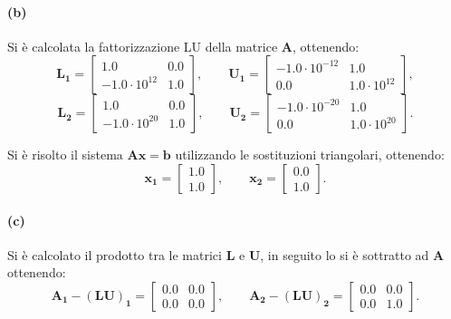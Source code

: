 \documentclass[letterpaper, 12pt]{article}
\begin{document}
\paragraph{(b) } \label{par:fattorizzazione_LU} Si è calcolata la fattorizzazione LU della matrice $\mathbf{A}$, ottenendo:
\begin{equation}
    \mathbf{L_1} = \begin{bmatrix}
    1.0      &  0.0 \\
    -1.0 \cdot 10^{12}  &  1.0 
    \end{bmatrix}, \qquad
    \mathbf{U_1} = \begin{bmatrix}
    -1.0 \cdot 10^{-12}  &  1.0               \\
     0.0                 &  1.0 \cdot 10^{12}
    \end{bmatrix},
\end{equation}
\begin{equation}
    \mathbf{L_2} = \begin{bmatrix}
    1.0                 &  0.0 \\
    -1.0 \cdot 10^{20}  &  1.0
    \end{bmatrix}, \qquad
    \mathbf{U_2} = \begin{bmatrix}
    -1.0 \cdot 10^{-20}  &  1.0 \\
     0.0                 &  1.0 \cdot 10^{20}
    \end{bmatrix}.
\end{equation}

Si è risolto il sistema $\mathbf{Ax} = \mathbf{b}$ utilizzando le sostituzioni triangolari, ottenendo:
\begin{equation}
    \mathbf{x_1} = \begin{bmatrix}
        1.0 \\
        1.0
    \end{bmatrix}, 
    \qquad
    \mathbf{x_2} = \begin{bmatrix}
        0.0 \\
        1.0
    \end{bmatrix}.
\end{equation}

\paragraph{(c) } Si è calcolato il prodotto tra le matrici $\mathbf{L}$ e $\mathbf{U}$, in seguito lo si è 
sottratto ad $\mathbf{A}$ ottenendo:
\begin{equation}
    \mathbf{A_1} - \mathbf{(LU)_1} = \begin{bmatrix}
        0.0 & 0.0 \\
        0.0 & 0.0
    \end{bmatrix}, 
    \qquad
    \mathbf{A_2} - \mathbf{(LU)_2} = \begin{bmatrix}
        0.0 & 0.0 \\
        0.0 & 1.0
    \end{bmatrix}.
\end{equation}
\end{document}
